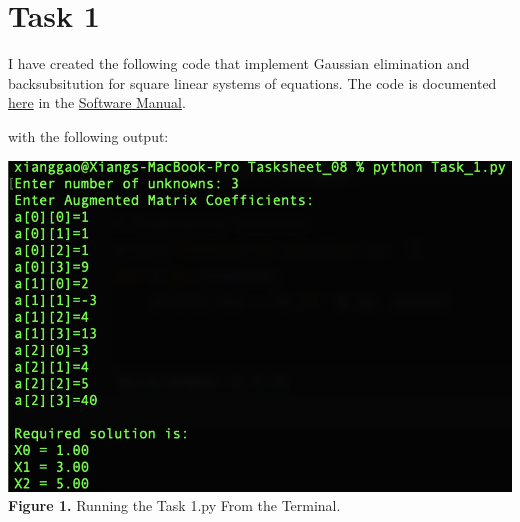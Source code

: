 \documentclass{article}
\begin{document}
\section*{Task 1}
I have created the following code that implement Gaussian elimination and backsubsitution for square linear systems of equations. The code is documented \href{https://github.com/GoByMark/math4610/blob/main/Homework_Tasks/Tasksheet_08/src/Task_1.py}{here} in the \href{https://github.com/GoByMark/math4610/blob/main/Homework_Tasks/Software_Manual/Software_Manual_toc.md}{Software Manual}.\\


\newpage

with the following output:
\begin{center}
\includegraphics[width=\textwidth]{Screenshots/1.png}\\
{\bf Figure 1.} Running the Task 1.py From the Terminal.
\end{center}
\end{document}
